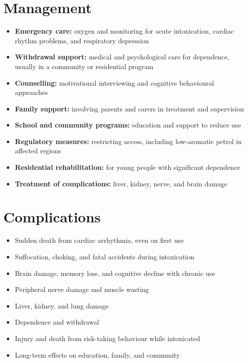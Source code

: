 \section*{Management}
\begin{itemize}
    \item \textbf{Emergency care:} oxygen and monitoring for acute intoxication, cardiac rhythm problems, and respiratory depression
    \item \textbf{Withdrawal support:} medical and psychological care for dependence, usually in a community or residential program
    \item \textbf{Counselling:} motivational interviewing and cognitive behavioural approaches
    \item \textbf{Family support:} involving parents and carers in treatment and supervision
    \item \textbf{School and community programs:} education and support to reduce use
    \item \textbf{Regulatory measures:} restricting access, including low-aromatic petrol in affected regions
    \item \textbf{Residential rehabilitation:} for young people with significant dependence
    \item \textbf{Treatment of complications:} liver, kidney, nerve, and brain damage
\end{itemize}

\section*{Complications}
\begin{itemize}
    \item Sudden death from cardiac arrhythmia, even on first use
    \item Suffocation, choking, and fatal accidents during intoxication
    \item Brain damage, memory loss, and cognitive decline with chronic use
    \item Peripheral nerve damage and muscle wasting
    \item Liver, kidney, and lung damage
    \item Dependence and withdrawal
    \item Injury and death from risk-taking behaviour while intoxicated
    \item Long-term effects on education, family, and community
\end{itemize}

